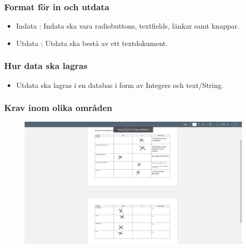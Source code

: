 \documentclass{article}
\begin{document}
\subsubsection{Format för in och utdata}
    \begin{itemize}
        \item Indata : Indata ska vara radiobuttons, textfields, länkar samt knappar.
          
          \item Utdata : Utdata ska bestå av ett textdokument.
    \end{itemize}

\subsubsection{Hur data ska lagras}
    \begin{itemize}
        \item Utdata ska lagras i en databas i form av Integers och text/String.
    \end{itemize}
    
\newpage
\subsubsection{Krav inom olika områden}

\begin{figure}[htp]
    \centering
    \includegraphics[width = 500px]{24.png}
    \label{fig:24}
\end{figure}
\newpage
\end{document}
